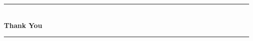 \documentclass[12pt]{article}
\theoremstyle{problemstyle}
\begin{document}
\begin{center}
    \vspace*{5cm}
    \rule{0.8\linewidth}{0.1pt}\\
    \vspace*{2cm}
    \Huge \textbf{Thank You}\\
    \vspace*{2cm}
    \rule{0.8\linewidth}{0.1pt}
    \vfill
\end{center}
\end{document}
